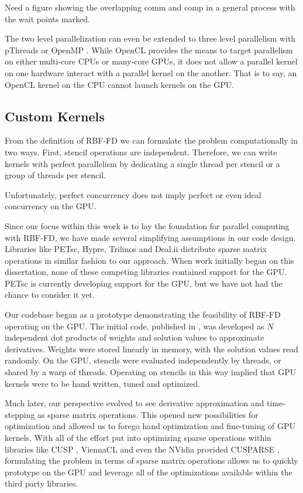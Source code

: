 \documentclass{report}
\begin{document}
Need a figure showing the overlapping comm and comp in a general process with the wait points marked. 

The two level parallelization can even be extended to three level parallelism
with pThreads or OpenMP \cite{NVidia_multi-gpu_example}. While OpenCL provides
the means to target parallelism on either multi-core CPUs or many-core GPUs, it
does not allow a parallel kernel on one hardware interact with a parallel kernel
on the another. That is to say, an OpenCL kernel on the CPU cannot launch
kernels on the GPU.  


\subsection{Custom Kernels}

From the definition of RBF-FD we can formulate the problem computationally in two ways. First, stencil operations are independent. Therefore, we can write kernels with perfect parallelism by dedicating a single thread per stencil or a group of threads per stencil.  

Unfortunately, perfect concurrency does not imply perfect or even ideal concurrency on the GPU. 

Since our focus within this work is to lay the foundation for parallel computing
with RBF-FD, we have made several simplifying assumptions in our code design.
Libraries like PETsc, Hypre, Trilinos and Deal.ii distribute sparse matrix
operations in similar fashion to our approach. When work initially began on this
dissertation, none of these competing libraries contained support for the GPU.
PETsc is currently developing support for the GPU, but we have not had the
chance to consider it yet. 

Our codebase began as a prototype demonstrating the feasibility of RBF-FD
operating on the GPU. The initial code, published in \cite{BolligFlyerErlebacher2012}, was developed as $N$ independent dot
products of weights and solution values to approximate derivatives. Weights were
stored linearly in memory, with the solution values read randomly. On the GPU,
stencils were evaluated independently by threads, or shared by a warp of
threads. Operating on stencils in this way implied that GPU kernels were to be
hand written, tuned and optimized. 

Much later, our perspective evolved to see derivative approximation and
time-stepping as sparse matrix operations. This opened new possibilities for
optimization and allowed us to forego hand optimization and fine-tuning of GPU
kernels. With all of the effort put into optimizing sparse operations within
libraries like CUSP \cite{Bell2009}, ViennaCL \cite{Rupp2010} and even the
NVidia provided CUSPARSE \cite{CUSPARSE}, formulating the problem in terms of
sparse matrix operations allows us to quickly prototype on the GPU and leverage
all of the optimizations available within the third party libraries. 
\end{document}
